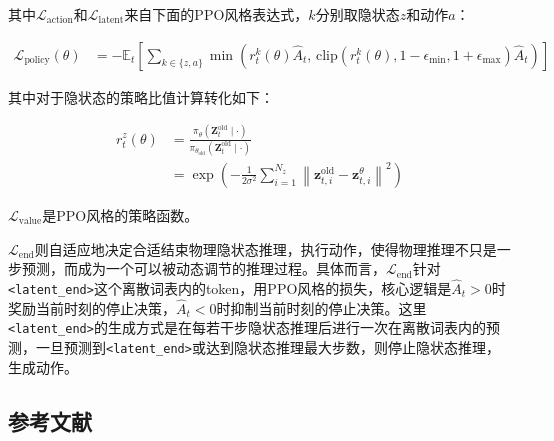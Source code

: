 其中\(\mathcal{L}_{\mathrm{action}}\)和\(\mathcal{L}_{\mathrm{latent}}\)来自下面的PPO风格表达式，\(k\)分别取隐状态\(z\)和动作\(a\)：

\[
\begin{aligned}
\mathcal{L}_{\mathrm{policy}}(\theta)
&= -\mathbb{E}_t
\left[
\sum_{k\in\{z,a\}}
\min\left(
r_t^k(\theta)\hat{A}_t,\,
\mathrm{clip}\left(r_t^k(\theta), 1-\epsilon_{\min}, 1+\epsilon_{\max}\right)\hat{A}_t
\right)
\right]
\end{aligned}
\]

其中对于隐状态的策略比值计算转化如下：

\[
\begin{aligned}
r_t^z(\theta)
&=
\frac{\pi_\theta\left(\mathbf{Z}_t^{\mathrm{old}}\mid \cdot\right)}
{\pi_{\theta_{\mathrm{old}}}\left(\mathbf{Z}_t^{\mathrm{old}}\mid \cdot\right)}
\\
&=
\exp\left(
-\frac{1}{2\sigma^2}
\sum_{i=1}^{N_z}
\left\|
\mathbf{z}_{t,i}^{\mathrm{old}}-\mathbf{z}_{t,i}^{\theta}
\right\|^2
\right)
\end{aligned}
\]

\(\mathcal{L}_{\mathrm{value}}\)是PPO风格的策略函数。

\(\mathcal{L}_{\mathrm{end}}\)则自适应地决定合适结束物理隐状态推理，执行动作，使得物理推理不只是一步预测，而成为一个可以被动态调节的推理过程。具体而言，\(\mathcal{L}_{\mathrm{end}}\)针对\texttt{\textless{}latent\_end\textgreater{}}这个离散词表内的token，用PPO风格的损失，核心逻辑是\(\hat{A}_t>0\)时奖励当前时刻的停止决策，\(\hat{A}_t<0\)时抑制当前时刻的停止决策。这里\texttt{\textless{}latent\_end\textgreater{}}的生成方式是在每若干步隐状态推理后进行一次在离散词表内的预测，一旦预测到\texttt{\textless{}latent\_end\textgreater{}}或达到隐状态推理最大步数，则停止隐状态推理，生成动作。

\hypertarget{ux53c2ux8003ux6587ux732e-203}{%
\subsection{参考文献}\label{ux53c2ux8003ux6587ux732e-203}}

